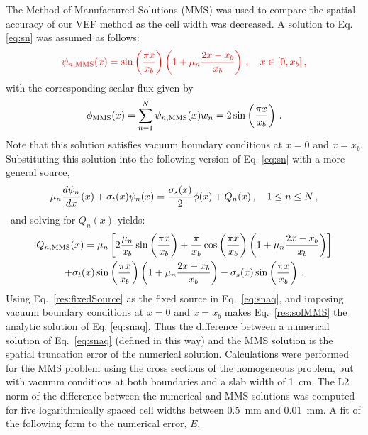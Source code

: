 The Method of Manufactured Solutions (MMS) was used to compare the spatial accuracy of our VEF method as the cell width was decreased. A solution to Eq. \ref{eq:sn} was assumed as follows: 
		\begin{equation} \label{res:solMMS}
			{\color{red}
			\psi_{n,\text{MMS}}(x) = \sin\left(\frac{\pi x}{x_b}\right) \left(1 + \mu_n \frac{2x - x_b}{x_b}\right) \,, \quad x\in[0,x_b] \,, 
			}
		\end{equation}
with the corresponding scalar flux given by
		\begin{equation}
			\phi_\text{MMS}(x) = \sum_{n=1}^N \psi_{n,\text{MMS}}(x) w_n = 2 \sin\left(\frac{\pi x}{x_b}\right) \,.
		\end{equation}
Note that this solution satisfies vacuum boundary conditions at $x=0$ and $x=x_b$.
Substituting this solution into the following version of Eq. \ref{eq:sn} with a more general source,
	\begin{equation} \label{eq:snaq}
		\mu_n \frac{d \psi_n}{d x}(x) + \sigma_t(x) \psi_n(x) = 
		\frac{\sigma_s(x)}{2} \phi(x) +  Q_n(x) \,, \quad 1 \leq n \leq N \,,
	\end{equation}\
and solving for $Q_n(x)$ yields:
	{\color{red}
	\begin{multline} \label{res:fixedSource}
		Q_{n,\text{MMS}}(x) = 
			\mu_n\left[ 2\frac{\mu_n}{x_b}\sin\left(\frac{\pi x}{x_b}\right) + 
				\frac{\pi}{x_b}\cos\left(\frac{\pi x}{x_b}\right)\left(1 + \mu_n \frac{2x-x_b}{x_b}\right) \right]
				\\+ \sigma_t(x)\sin\left(\frac{\pi x}{x_b}\right)\left(1 + \mu_n \frac{2x - x_b}{x_b}\right) - \sigma_s(x) \sin\left(\frac{\pi x}{x_b}\right) \,.
	\end{multline}}%
Using Eq.~\ref{res:fixedSource} as the fixed source in Eq.~\ref{eq:snaq}, and imposing 
vacuum boundary conditions at $x=0$ and $x=x_b$ makes Eq.~\ref{res:solMMS} the 
analytic solution of Eq. \ref{eq:snaq}.  Thus the difference between a numerical 
solution of Eq.~\ref{eq:snaq} (defined in this way) and the MMS solution is the spatial truncation error of the numerical solution.  
Calculations were performed for the MMS problem using the cross sections of the homogeneous 
problem, but with vacumm conditions at both boundaries and a slab width of \SI{1}{cm}.
The L2 norm of the difference between the numerical and MMS solutions was computed for five logarithmically spaced cell widths between \SI{0.5}{mm} and \SI{0.01}{mm}.  A fit of the following form to the numerical error, $E$,  
